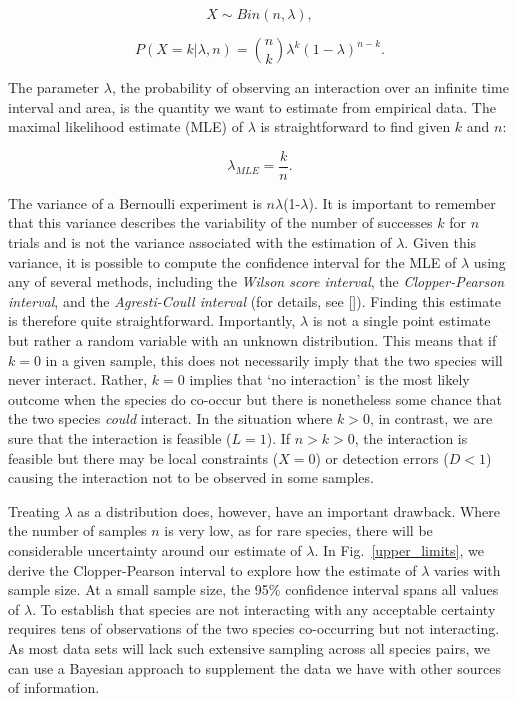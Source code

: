 \documentclass[12pt]{article}
\begin{document}
\begin{spacing}{2.0}
      \begin{equation}
        X \sim Bin(n,\lambda) ,
      \end{equation}


      \begin{equation}
         P(X = k|\lambda,n) = {n \choose k}\lambda^k(1-\lambda)^{n-k} . 
         \label{likelihood}
      \end{equation}

  \noindent The parameter $\lambda$, the probability of observing an interaction over an infinite time interval and area, is the quantity we want to estimate from empirical data. 
  The maximal likelihood estimate (MLE) of $\lambda$ is straightforward to find given $k$ and $n$:

      \begin{equation}
        \lambda_{MLE} = \frac{k}{n}  .
        \label{theta_MLE}
      \end{equation}

  The variance of a Bernoulli experiment is $n\lambda$(1-$\lambda$). It is important to remember that this variance describes the variability of the number of successes $k$ for $n$ trials and is not the variance associated with the estimation of $\lambda$. Given this variance, it is possible to compute the confidence interval for the MLE of $\lambda$ using any of several methods, including the \emph{Wilson score interval}, the \emph{Clopper-Pearson interval}, and the \emph{Agresti-Coull interval} (for details, see [\citealp{Brown2001}]). Finding this estimate is therefore quite straightforward. Importantly, $\lambda$ is not a single point estimate but rather a random variable with an unknown distribution. This means that if $k = 0$ in a given sample, this does not necessarily imply that the two species will never interact. Rather, $k = 0$ implies that `no interaction' is the most likely outcome when the species do co-occur but there is nonetheless some chance that the two species \emph{could} interact. In the situation where $k>0$, in contrast, we are sure that the interaction is feasible ($L = 1$). If $n>k>0$, the interaction is feasible but there may be local constraints ($X=0$) or detection errors ($D<1$) causing the interaction not to be observed in some samples. %


  Treating $\lambda$ as a distribution does, however, have an important drawback. Where the number of samples $n$ is very low, as for rare species, there will be considerable uncertainty around our estimate of $\lambda$. In Fig.~\ref{upper_limits}, we derive the Clopper-Pearson interval to explore how the estimate of $\lambda$ varies with sample size. At a small sample size, the 95\% confidence interval spans all values of $\lambda$. To establish that species are not interacting with any acceptable certainty requires tens of observations of the two species co-occurring but not interacting. As most data sets will lack such extensive sampling across all species pairs, we can use a Bayesian approach to supplement the data we have with other sources of information.



\end{spacing}
\end{document}
